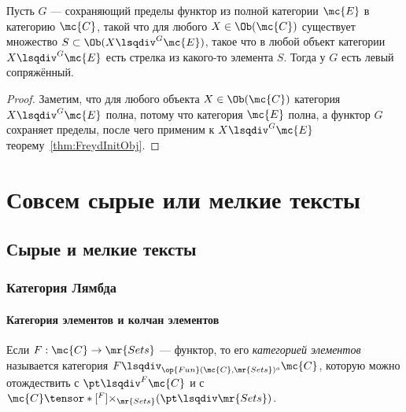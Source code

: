 \documentclass[
	extrafontsizes,
	11pt,
	hyphens,
]{memoir}
\begin{document}
\begin{theorem}
Пусть \(G\) --- сохраняющий пределы функтор из полной категории \(\mc{E}\) в категорию \(\mc{C}\),
такой что для любого \(X \in \Ob(\mc{C})\) существует множество \(S \subset \Ob(X \lsqdiv^G \mc{E})\), такое что в любой объект категории \(X \lsqdiv^G \mc{E}\) есть стрелка из какого-то элемента \(S\).
Тогда у \(G\) есть левый сопряжённый.
\end{theorem}

\begin{proof}
Заметим, что для любого объекта \(X \in \Ob(\mc{C})\) категория \(X \lsqdiv^G \mc{E}\) полна, потому что категория \(\mc{E}\) полна, а функтор \(G\) сохраняет пределы, после чего применим к \(X \lsqdiv^G \mc{E}\) теорему~\ref{thm:FreydInitObj}.
\end{proof}




\part{Совсем сырые или мелкие тексты}



%



\chapter{Сырые и мелкие тексты}


\section{Категория Лямбда}

\subsection{Категория элементов и колчан элементов}

\begin{definition}
Если \(F : \mc{C} \to \mr{Sets}\) --- функтор, то его \emph{категорией элементов} называется категория
\(F \lsqdiv_{\op{Fun}(\mc{C},\mr{Sets})^o} \mc{C}\),
которую можно отождествить с
\(\pt \lsqdiv^F \mc{C}\) и с \(\mc{C} \tensor*[^F]{\times}{_{\mr{Sets}}} (\pt \lsqdiv \mr{Sets})\).
\end{definition}

\end{document}
